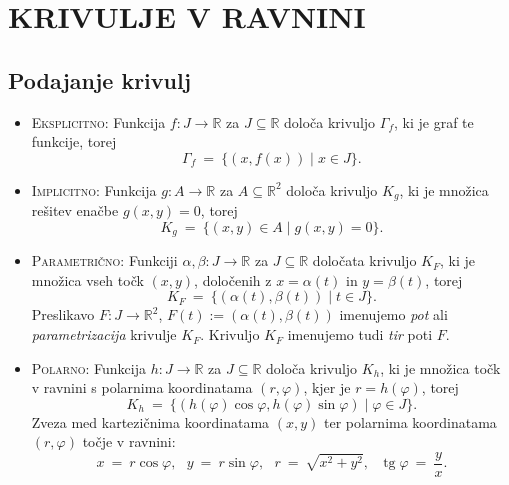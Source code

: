 \documentclass[11pt]{article}
\DeclareMathOperator{\tg}{tg}
\theoremstyle{definition}
\theoremstyle{definition}
\theoremstyle{definition}
\theoremstyle{theorem}
\begin{document}

\pagebreak


\section{KRIVULJE V RAVNINI}
\vspace{0.5cm}


\subsection{Podajanje krivulj}
\vspace{0.5cm}

\begin{itemize}
	\item \textsc{Eksplicitno:} Funkcija $f: J \rightarrow \mathbb{R}$ za $J \subseteq \mathbb{R}$ določa krivuljo $\Gamma_f$, ki je graf te funkcije, torej
	$$\Gamma_f ~=~ \{(x, f(x)) \mid x \in J\}.$$
	\item \textsc{Implicitno:} Funkcija $g: A \rightarrow \mathbb{R}$ za $A \subseteq \mathbb{R}^2$ določa krivuljo $K_g$, ki je množica rešitev enačbe $g(x, y) = 0$, torej
	$$K_g ~=~ \{(x, y) \in A \mid g(x, y) = 0\}.$$
	\item \textsc{Parametrično:} Funkciji $\alpha, \beta: J \rightarrow \mathbb{R}$ za $J \subseteq \mathbb{R}$ določata krivuljo $K_F$, ki je množica vseh točk $(x, y)$, določenih z $x = \alpha(t)$ in $y = \beta(t)$, torej
	$$K_F ~=~ \{(\alpha(t), \beta(t)) \mid t \in J\}.$$
	Preslikavo $F: J \rightarrow \mathbb{R}^2$, $F(t) := (\alpha(t), \beta(t))$ imenujemo \textit{pot} ali \\\textit{parametrizacija} krivulje $K_F$. Krivuljo $K_F$ imenujemo tudi \textit{tir} poti $F$.
	\item \textsc{Polarno:} Funkcija $h: J \rightarrow \mathbb{R}$ za $J \subseteq \mathbb{R}$ določa krivuljo $K_h$, ki je množica točk v ravnini s polarnima koordinatama $(r, \varphi)$, kjer je $r = h(\varphi)$, torej
	$$K_h ~=~ \{(h(\varphi)\cos{\varphi}, h(\varphi)\sin{\varphi}) \mid \varphi \in J\}.$$
	Zveza med kartezičnima koordinatama $(x, y)$ ter polarnima \hbox{koordinatama} $(r, \varphi)$ točje v ravnini:
	$$x ~=~ r \cos{\varphi}, ~~~y ~=~ r \sin{\varphi}, ~~~r ~=~ \sqrt{x^2 + y^2}, ~~~\tg{\varphi} ~=~ \frac{y}{x}.$$
\end{itemize}
\vspace{0.5cm}
\end{document}
